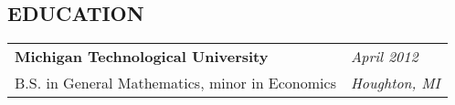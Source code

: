 \documentclass[margin,line]{res}
\begin{document}
\begin{resume}
\vspace{3pt}


\section{EDUCATION}

\begin{tabular}{p{4.4in} l}
  {\bf Michigan Technological University} & \emph{April 2012} \\
  B.S. in General Mathematics, minor in Economics & \emph{Houghton, MI} \\
\end{tabular}


\end{resume}
\end{document}
